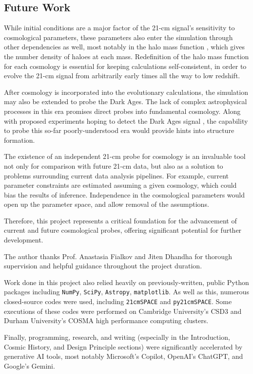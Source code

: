 \documentclass[floats,floatfix,showpacs,amssymb,prd,superscriptaddress,nofootinbib]{revtex4-2} %
\newcommand{\code}{\texttt}
\begin{document}
\subsection{Future Work}
While initial conditions are a major factor of the 21-cm signal's sensitivity to cosmological parameters, these parameters also enter the simulation through other dependencies as well, most notably in the halo mass function \citep{Murray_2013, Greig_2024}, which gives the number density of haloes at each mass. Redefinition of the halo mass function for each cosmology is essential for keeping calculations self-consistent, in order to evolve the 21-cm signal from arbitrarily early times all the way to low redshift.

After cosmology is incorporated into the evolutionary calculations, the simulation may also be extended to probe the Dark Ages. The lack of complex astrophysical processes in this era promises direct probes into fundamental cosmology. Along with proposed experiments hoping to detect the Dark Ages signal \citep{Fialkov_2024}, the capability to probe this so-far poorly-understood era would provide hints into structure formation.

The existence of an independent 21-cm probe for cosmology is an invaluable tool not only for comparison with future 21-cm data, but also as a solution to problems surrounding current data analysis pipelines. For example, current parameter constraints are estimated assuming a given cosmology, which could bias the results of inference. Independence in the cosmological parameters would open up the parameter space, and allow removal of the assumptions. 

Therefore, this project represents a critical foundation for the advancement of current and future cosmological probes, offering significant potential for further development.



\begin{acknowledgments}
The author thanks Prof. Anastasia Fialkov and Jiten Dhandha for thorough supervision and helpful guidance throughout the project duration. 

Work done in this project also relied heavily on previously-written, public Python packages including \code{NumPy}, \code{SciPy}, \code{Astropy}, \code{matplotlib}. As well as this, numerous closed-source codes were used, including \code{21cmSPACE} and \code{py21cmSPACE}. Some executions of these codes were performed on Cambridge University's CSD3 and Durham University's COSMA high performance computing clusters.

Finally, programming, research, and writing (especially in the Introduction, Cosmic History, and Design Principle sections) were significantly accelerated by generative AI tools, most notably Microsoft's Copilot, OpenAI's ChatGPT, and Google's Gemini. 
\end{acknowledgments}
\end{document}

